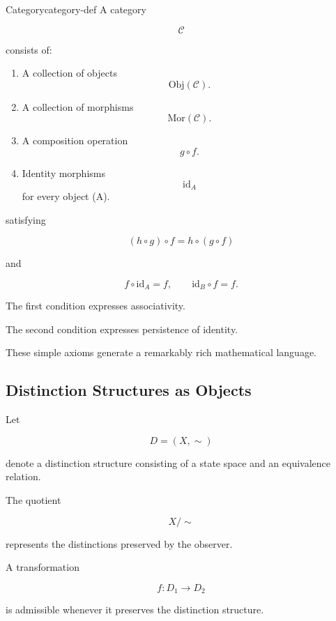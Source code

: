 \documentclass[12pt,twoside,openright]{book}
\begin{document}
\begin{definition}{Category}{category-def}
A category

\[
\mathcal C
\]

consists of:

\begin{enumerate}
\item A collection of objects
\[
\mathrm{Obj}(\mathcal C).
\]

\item A collection of morphisms
\[
\mathrm{Mor}(\mathcal C).
\]

\item A composition operation
\[
g\circ f.
\]

\item Identity morphisms
\[
\mathrm{id}_A
\]
for every object (A).
\end{enumerate}

satisfying

\[
(h\circ g)\circ f
=

h\circ(g\circ f)
\]

and

\[
f\circ\mathrm{id}_A
=

f,
\qquad
\mathrm{id}_B\circ f
=

f.
\]
\end{definition}

The first condition expresses associativity.

The second condition expresses persistence of identity.

These simple axioms generate a remarkably rich
mathematical language.

\subsection{Distinction Structures as Objects}

Let

\[
D=(X,\sim)
\]

denote a distinction structure consisting of a state space
and an equivalence relation.

The quotient

\[
X/{\sim}
\]

represents the distinctions preserved by the observer.

A transformation

\[
f:D_1\rightarrow D_2
\]

is admissible whenever it preserves the distinction
structure.
\end{document}
